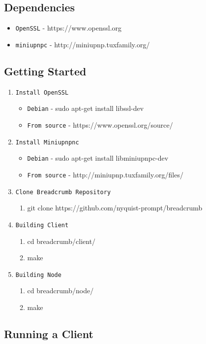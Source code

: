 \documentclass{article}
\begin{document}
\subsection{Dependencies}
\begin{itemize}
	\item \texttt{OpenSSL} - https://www.openssl.org
	\item \texttt{miniupnpc} - http://miniupnp.tuxfamily.org/
\end{itemize}
\subsection{Getting Started}
\begin{enumerate}
	\item \texttt{Install OpenSSL}
		\begin{itemize}
			\item \texttt{Debian} - sudo apt-get install libssl-dev
			\item \texttt{From source} - https://www.openssl.org/source/
		\end{itemize}
	\item \texttt{Install Miniupnpnc}
		\begin{itemize}
			\item \texttt{Debian} - sudo apt-get install libminiupnpc-dev
			\item \texttt{From source} - http://miniupnp.tuxfamily.org/files/
		\end{itemize}
	\item \texttt{Clone Breadcrumb Repository}
		\begin{enumerate}
			\item git clone https://github.com/nyquist-prompt/breadcrumb
		\end{enumerate}
	\item \texttt{Building Client}
		\begin{enumerate}
			\item cd breadcrumb/client/
			\item make
		\end{enumerate}
	\item \texttt{Building Node}
		\begin{enumerate}
			\item cd breadcrumb/node/
			\item make
		\end{enumerate}
\end{enumerate}

\subsection{Running a Client}
\end{document}
